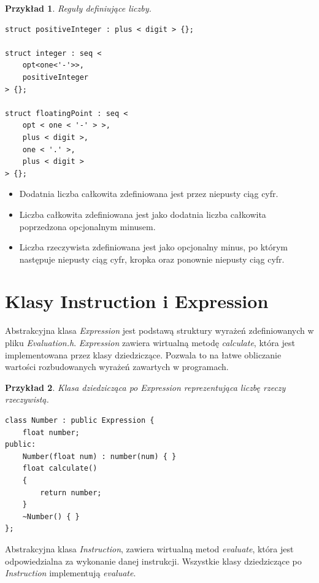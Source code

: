 \documentclass[declaration,shortabstract, inz]{iithesis}
\theoremstyle{definition} \newtheorem{definition}{Definicja}[]
\theoremstyle{plain} \newtheorem{remark}[definition]{Obserwacja}
\theoremstyle{plain} \newtheorem{theorem}[definition]{Twierdzenie}
\theoremstyle{plain} \newtheorem{example}{Przykład}[definition]
\theoremstyle{plain} \newtheorem{lemma}[definition]{Lemat}
\begin{document}
\begin{example}
Reguły definiujące liczby.
\begin{center}
\begin{lstlisting}
struct positiveInteger : plus < digit > {};

struct integer : seq <
	opt<one<'-'>>,
	positiveInteger
> {};

struct floatingPoint : seq <
	opt < one < '-' > >,
	plus < digit >,
	one < '.' >,
	plus < digit >
> {};
\end{lstlisting}
\end{center}
\end{example}

\begin{itemize}
\item Dodatnia liczba całkowita zdefiniowana jest przez niepusty ciąg cyfr.
\item Liczba całkowita zdefiniowana jest jako dodatnia liczba całkowita poprzedzona opcjonalnym minusem.
\item Liczba rzeczywista zdefiniowana jest jako opcjonalny minus, po którym następuje niepusty ciąg cyfr, kropka oraz ponownie niepusty ciąg cyfr.
\end{itemize}

\section{Klasy Instruction i Expression}

Abstrakcyjna klasa \textit{Expression} jest podstawą struktury wyrażeń zdefiniowanych w pliku \textit{Evaluation.h}. \textit{Expression} zawiera wirtualną metodę \textit{calculate}, która jest implementowana przez klasy dziedziczące. Pozwala to na łatwe obliczanie wartości rozbudowanych wyrażeń zawartych w programach.

\begin{example}
Klasa dziedzicząca po \textit{Expression} reprezentująca liczbę rzeczy rzeczywistą.
\begin{center}
\begin{lstlisting}
class Number : public Expression {
    float number;
public:
    Number(float num) : number(num) { }
    float calculate()
    {
        return number;
    }
    ~Number() { }
};
\end{lstlisting}
\end{center}
\end{example}

Abstrakcyjna klasa \textit{Instruction}, zawiera wirtualną metod \textit{evaluate}, która jest odpowiedzialna za wykonanie danej instrukcji. Wszystkie klasy dziedziczące po \textit{Instruction} implementują \textit{evaluate}. 
\end{document}
